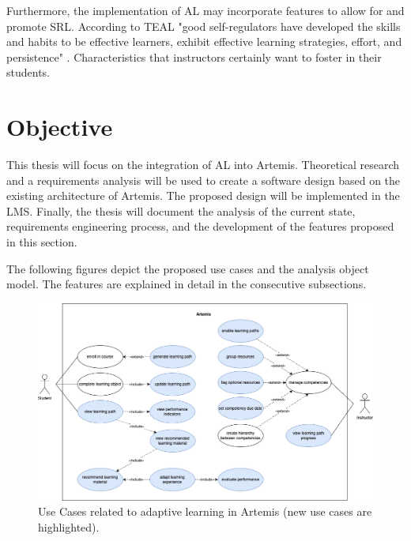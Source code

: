 \documentclass[a4paper,12pt,twoside]{article}
\begin{document}
Furthermore, the implementation of \ac{AL} may incorporate features to allow for and promote \ac{SRL}. According to TEAL
"good self-regulators have developed the skills and habits to be effective learners, exhibit effective learning strategies, effort, and persistence" \cite{no2012self}.
Characteristics that instructors certainly want to foster in their students.


\section{Objective}

This thesis will focus on the integration of \ac{AL} into Artemis.
Theoretical research and a requirements analysis will be used to create a software design based on the existing architecture of Artemis. The proposed
design will be implemented in the \ac{LMS}. Finally, the thesis will document the analysis of the current state, requirements engineering process,
and the development of the features proposed in this section.

The following figures depict the proposed use cases and the analysis object model. The features are explained in detail in the consecutive subsections.

\begin{figure}[h!]
        \centering
        \includegraphics[width=\linewidth]{figures/UseCases(3).png}
        \caption{Use Cases related to adaptive learning in Artemis (new use cases are highlighted).}
        \label{fig:UseCases}
\end{figure}
\end{document}
